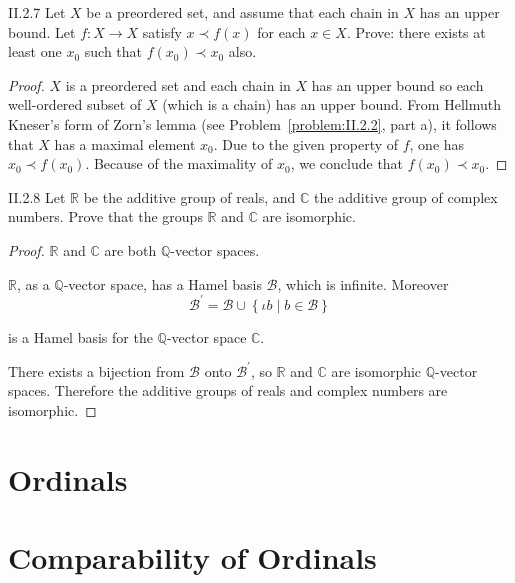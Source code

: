 \begin{problem}{II.2.7}
Let \(X\) be a preordered set, and assume that each chain in \(X\) has an upper bound. Let \(f: X \to X\) satisfy \( x \prec f(x) \) for each \( x \in X \). Prove: there exists at least one \(x_{0}\) such that \( f(x_{0}) \prec x_{0} \) also.
\end{problem}

\begin{proof}
	\(X\) is a preordered set and each chain in \(X\) has an upper bound so each well-ordered subset of \(X\) (which is a chain) has an upper bound. From Hellmuth Kneser's form of Zorn's lemma (see Problem~\ref{problem:II.2.2}, part a), it follows that \(X\) has a maximal element \(x_{0}\). Due to the given property of \( f \), one has \( x_{0} \prec f(x_{0}) \). Because of the maximality of \(x_{0}\), we conclude that \( f(x_{0}) \prec x_{0} \).
\end{proof}

\begin{problem}{II.2.8}
Let \( \mathbb{R} \) be the additive group of reals, and \( \mathbb{C} \) the additive group of complex numbers. Prove that the groups \( \mathbb{R} \) and \( \mathbb{C} \) are isomorphic.
\end{problem}

\begin{proof}
	\( \mathbb{R} \) and \( \mathbb{C} \) are both \( \mathbb{Q} \)-vector spaces.

	\( \mathbb{R} \), as a \( \mathbb{Q} \)-vector space, has a Hamel basis \( \mathscr{B} \), which is infinite. Moreover
	\[
		\mathscr{B}^{\prime} = \mathscr{B} \cup \left\{ \iota b \mid b \in \mathscr{B} \right\}
	\]

	is a Hamel basis for the \( \mathbb{Q} \)-vector space \( \mathbb{C} \).

	There exists a bijection from \( \mathscr{B} \) onto \( \mathscr{B}^{\prime} \), so \( \mathbb{R} \) and \( \mathbb{C} \) are isomorphic \(\mathbb{Q}\)-vector spaces. Therefore the additive groups of reals and complex numbers are isomorphic.
\end{proof}

\section{Ordinals}

\section{Comparability of Ordinals}

